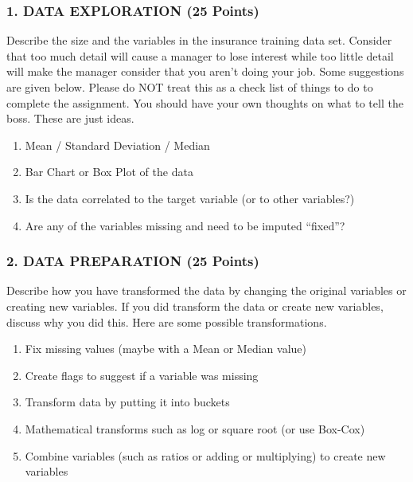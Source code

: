 \documentclass[
]{article}
\providecommand{\tightlist}{%
  \setlength{\itemsep}{0pt}\setlength{\parskip}{0pt}}
\begin{document}
\hypertarget{data-exploration-25-points}{%
\subsubsection{1. DATA EXPLORATION (25
Points)}\label{data-exploration-25-points}}

Describe the size and the variables in the insurance training data set.
Consider that too much detail will cause a manager to lose interest
while too little detail will make the manager consider that you aren't
doing your job. Some suggestions are given below. Please do NOT treat
this as a check list of things to do to complete the assignment. You
should have your own thoughts on what to tell the boss. These are just
ideas.

\begin{enumerate}
\def\labelenumi{\alph{enumi}.}
\tightlist
\item
  Mean / Standard Deviation / Median
\item
  Bar Chart or Box Plot of the data
\item
  Is the data correlated to the target variable (or to other variables?)
\item
  Are any of the variables missing and need to be imputed ``fixed''?
\end{enumerate}

\hypertarget{data-preparation-25-points}{%
\subsubsection{2. DATA PREPARATION (25
Points)}\label{data-preparation-25-points}}

Describe how you have transformed the data by changing the original
variables or creating new variables. If you did transform the data or
create new variables, discuss why you did this. Here are some possible
transformations.

\begin{enumerate}
\def\labelenumi{\alph{enumi}.}
\tightlist
\item
  Fix missing values (maybe with a Mean or Median value)
\item
  Create flags to suggest if a variable was missing
\item
  Transform data by putting it into buckets
\item
  Mathematical transforms such as log or square root (or use Box-Cox)
\item
  Combine variables (such as ratios or adding or multiplying) to create
  new variables
\end{enumerate}
\end{document}
